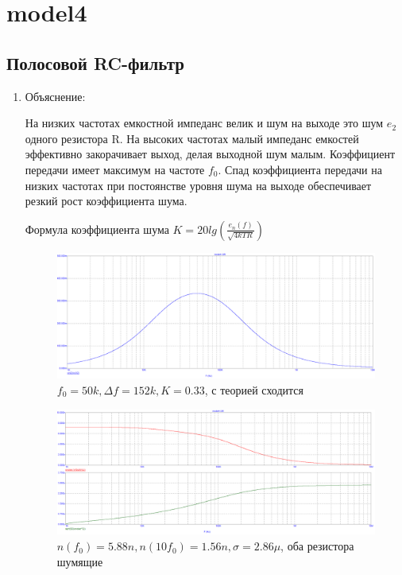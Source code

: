 \documentclass[a4paper, 12pt]{article}%
\begin{document}
\section{\textbf{model4}}

\subsection*{Полосовой RC-фильтр}

\begin{enumerate}

\item

Объяснение:

На низких частотах емкостной импеданс велик и шум на выходе это шум $e_2$ одного резистора R. На высоких частотах малый импеданс емкостей эффективно закорачивает выход, делая выходной шум малым. Коэффициент передачи имеет максимум на частоте $f_0$. Спад коэффициента передачи на низких частотах при постоянстве уровня шума на выходе обеспечивает резкий рост коэффициента шума.

Формула коэффициента шума $K = 20 lg \left( \frac{e_n(f)}{\sqrt{4 k T R}} \right)$

\FloatBarrier
\begin{figure}
    \centering
    \includegraphics[scale=0.3]{images/mod4_2_1.png}
    \caption{$f_0 = 50k, \Delta f = 152k, K = 0.33$, с теорией сходится}
    \label{fig:m421}
\end{figure}

\begin{figure}
    \centering
    \includegraphics[scale=0.3]{images/mod4_2_2_1.png}
    \caption{$n(f_0) = 5.88n, n(10 f_0) = 1.56n, \sigma = 2.86\mu$, оба резистора шумящие}
    \label{fig:m4221}
\end{figure}


\end{enumerate}
\end{document}
